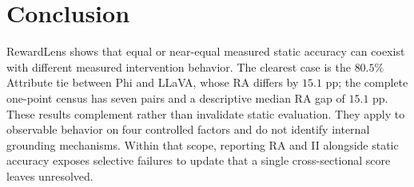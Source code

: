 \section{Conclusion}
\label{sec:conclusion}

RewardLens shows that equal or near-equal measured static accuracy can coexist
with different measured intervention behavior. The clearest case is the
$80.5\%$ Attribute tie between Phi and LLaVA, whose RA differs by $15.1$ pp;
the complete one-point census has seven pairs and a descriptive median RA gap
of $15.1$ pp. These results complement rather than invalidate static
evaluation. They apply to observable behavior on four controlled factors and
do not identify internal grounding mechanisms. Within that scope, reporting
RA and II alongside static accuracy exposes selective failures to update that a
single cross-sectional score leaves unresolved.

